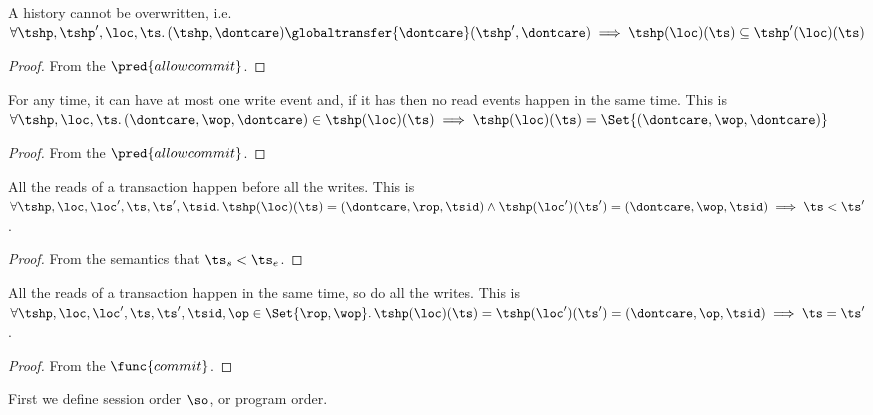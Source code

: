 \begin{lem}
    A history cannot be overwritten, i.e.\ \( \forall \tshp, \tshp', \loc, \ts \ldotp ( \tshp, \dontcare ) \globaltransfer{\dontcare} ( \tshp', \dontcare ) \implies \tshp(\loc)(\ts) \subseteq \tshp'(\loc)(\ts)\)
\end{lem}
\begin{proof}
    From the \( \pred{allowcommit} \).
\end{proof}

\begin{lem}
    For any time, it can have at most one write event and, if it has then no read events happen in the same time. This is \ \( \forall \tshp, \loc, \ts \ldotp ( \dontcare, \wop, \dontcare ) \in \tshp(\loc)(\ts) \implies \tshp(\loc)(\ts) =  \Set{( \dontcare, \wop, \dontcare )} \)
\end{lem}
\begin{proof}
    From the \( \pred{allowcommit} \).
\end{proof}


\begin{lem}
    \label{lem:read-before-write}
    All the reads of a transaction happen before all the writes. This is 
    \( \forall \tshp, \loc, \loc', \ts, \ts', \tsid \ldotp \tshp(\loc)(\ts) = (\dontcare, \rop, \tsid) \land \tshp(\loc')(\ts') = (\dontcare, \wop, \tsid) \implies \ts < \ts' \).
\end{lem}
\begin{proof}
    From the semantics that \( \ts_{s} < \ts_{e} \).
\end{proof}

\begin{lem}
    \label{lem:atoic-rw}
    All the reads of a transaction happen in the same time, so do all the writes. This is 
    \( \forall \tshp, \loc, \loc', \ts, \ts', \tsid, \op \in \Set{\rop, \wop} \ldotp \tshp(\loc)(\ts) =  \tshp(\loc')(\ts') = (\dontcare, \op, \tsid) \implies \ts = \ts' \).
\end{lem}
\begin{proof}
    From the \( \func{commit} \).
\end{proof}

First we define session order \( \so \), or program order.

